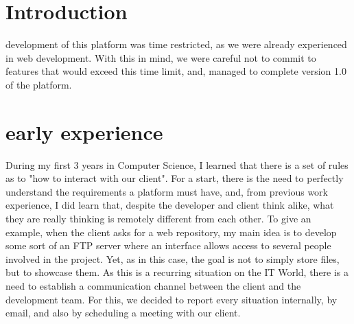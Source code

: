 \documentclass[a4paper,12pt,journal,twoside,compsoc]{PPIEEEtran}
\begin{document}

\maketitle

\IEEEdisplaynontitleabstractindextext
\IEEEpeerreviewmaketitle
\section{Introduction}
% 
% 
 development of this platform was time restricted, as we were already experienced in web development. With this in mind, we were careful not to commit to features that would exceed this time limit, and, managed to complete version 1.0 of the platform.
\section{early experience}
During my first 3 years in Computer Science, I learned that there is a set of rules as to "how to interact with our client". For a start, there is the need to perfectly understand the requirements a platform must have, and, from previous work experience, I did learn that, despite the developer and client think alike, what they are really thinking is remotely different from each other.
To give an example, when the client asks for a web repository, my main idea is to develop some sort of an FTP server where an interface allows access to several people involved in the project. Yet, as in this case, the goal is not to simply store files, but to showcase them. As this is a recurring situation on the IT World, there is a need to establish a communication channel between the client and the development team. For this, we decided to report every situation internally, by email, and also by scheduling a meeting with our client.
\end{document}
